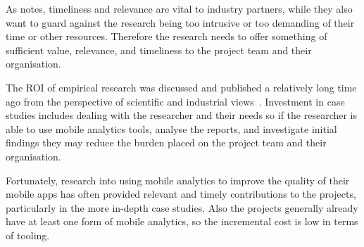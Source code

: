 As \citet[p.324]{barroca_2018_bridging_the_gap} notes, timeliness and relevance are vital to industry partners, while they also want to guard against the research being too intrusive or too demanding of their time or other resources. Therefore the research needs to offer something of sufficient value, relevance, and timeliness to the project team and their organisation. 

The ROI of empirical research was discussed and published a relatively long time ago from the perspective of scientific and industrial views~\citet[pp. 54-57]{prechelt_2007_optimizing_ROI_for_empirical_SE_studies}. Investment in case studies includes dealing with the researcher and their needs so if the researcher is able to use mobile analytics tools, analyse the reports, and investigate initial findings they may reduce the burden placed on the project team and their organisation.

Fortunately, research into using mobile analytics to improve the quality of their mobile apps has often provided relevant and timely contributions to the projects, particularly in the more in-depth case studies. Also the projects generally already have at least one form of mobile analytics, so the incremental cost is low in terms of tooling.
 
